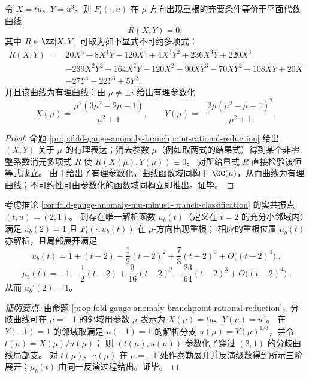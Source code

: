 \begin{proposition}[分歧曲线在单项式坐标 \texorpdfstring{$(X,Y)=(tu,u^3)$}{(X,Y)=(tu,u^3)} 下的显式代数方程与有理性]\label{prop:fold-gauge-anomaly-branch-curve-XY-explicit}
令 \(X=tu\)、\(Y=u^3\)。则 \(F_t(\cdot,u)\) 在 \(\mu\)-方向出现重根的充要条件等价于平面代数曲线
\[
R(X,Y)=0,
\]
其中 \(R\in\ZZ[X,Y]\) 可取为如下显式不可约多项式：
\[
\begin{aligned}
R(X,Y)=\;&20X^5-8X^4Y-120X^4+4X^3Y^2+236X^3Y+220X^3\\
&-239X^2Y^2-164X^2Y-120X^2+90XY^3-70XY^2-108XY+20X\\
&-27Y^4-22Y^3+5Y^2.
\end{aligned}
\]
并且该曲线为有理曲线：由 \(\mu\neq \pm i\) 给出有理参数化
\[
X(\mu)=\frac{\mu^2(3\mu^2-2\mu-1)}{\mu^2+1},\qquad
Y(\mu)=-\frac{2\mu(\mu^2-\mu-1)^2}{\mu^2+1}.
\]
\end{proposition}
\begin{proof}
命题 \ref{prop:fold-gauge-anomaly-branchpoint-rational-reduction} 给出 \((X,Y)\) 关于 \(\mu\) 的有理表达；消去参数 \(\mu\)（例如取两式的结果式）得到某个非零整系数消元多项式 \(R\) 使 \(R(X(\mu),Y(\mu))\equiv 0\)。
对所给显式 \(R\) 直接检验该恒等式成立。
由于给出了有理参数化，曲线函数域同构于 \(\CC(\mu)\)，从而曲线为有理曲线；不可约性可由参数化的函数域同构立即推出。证毕。
\end{proof}

\begin{proposition}[\texorpdfstring{$(t,u)=(2,1)$}{(t,u)=(2,1)} 共振点附近的解析分歧支与三阶展开]\label{prop:fold-gauge-anomaly-resonant-branchpoint-series}
考虑推论 \ref{cor:fold-gauge-anomaly-mu-minus1-branch-classification} 的实共振点 \((t,u)=(2,1)\)。
则存在唯一解析函数 \(u_b(t)\)（定义在 \(t=2\) 的充分小邻域内）满足 \(u_b(2)=1\) 且 \(F_t(\cdot,u_b(t))\) 在 \(\mu\)-方向出现重根；
相应的重根位置 \(\mu_b(t)\) 亦解析，且局部展开满足
\[
\boxed{\;
u_b(t)=1+(t-2)-\frac12(t-2)^2+\frac78(t-2)^3+O\!\bigl((t-2)^4\bigr)\;},
\]
\[
\boxed{\;
\mu_b(t)=-1-\frac12(t-2)+\frac{3}{16}(t-2)^2-\frac{23}{64}(t-2)^3+O\!\bigl((t-2)^4\bigr)\; }.
\]
从而 \(u_b'(2)=1\)。
\end{proposition}
\begin{proof}[证明要点]
由命题 \ref{prop:fold-gauge-anomaly-branchpoint-rational-reduction}，分歧曲线可在 \(\mu=-1\) 的邻域用参数 \(\mu\) 表示为 \(X(\mu)=tu\)、\(Y(\mu)=u^3\)。
在 \(Y(-1)=1\) 的邻域取满足 \(u(-1)=1\) 的解析分支 \(u(\mu)=Y(\mu)^{1/3}\)，并令 \(t(\mu)=X(\mu)/u(\mu)\)；
则 \((t(\mu),u(\mu))\) 参数化了穿过 \((2,1)\) 的分歧曲线局部支。
对 \(t(\mu)\)、\(u(\mu)\) 在 \(\mu=-1\) 处作泰勒展开并反演级数得到所示三阶展开；\(\mu_b(t)\) 由同一反演过程给出。证毕。
\end{proof}

